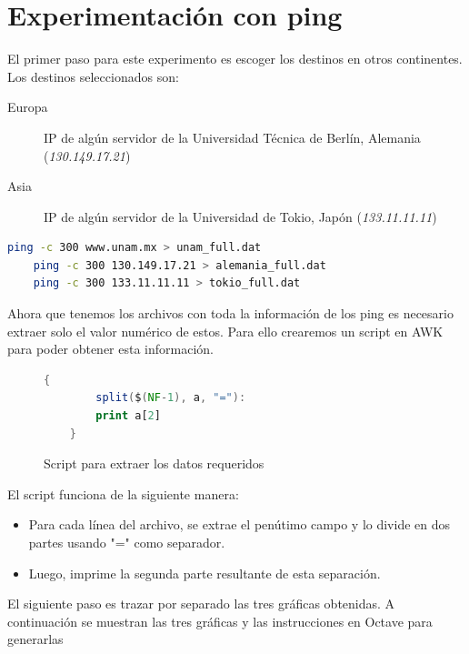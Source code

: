 \section*{Experimentación con ping}

\noindent El primer paso para este experimento es escoger los destinos en otros continentes. Los destinos seleccionados son:

\begin{description}
	\item[Europa] IP de algún servidor de la Universidad Técnica de Berlín, Alemania (\emph{130.149.17.21})
	\item[Asia] IP de algún servidor de la Universidad de Tokio, Japón (\emph{133.11.11.11})
\end{description}

\begin{lstlisting}[language=Bash, caption=Pings con 300 muestras guardando la salida, label=lst:pings]
	ping -c 300 www.unam.mx > unam_full.dat
	ping -c 300 130.149.17.21 > alemania_full.dat
	ping -c 300 133.11.11.11 > tokio_full.dat
\end{lstlisting}

\noindent Ahora que tenemos los archivos con toda la informaci\'on de los ping es necesario extraer solo el valor num\'erico de estos. Para ello crearemos un script en AWK para poder obtener esta informaci\'on. 

\begin{figure}[H]
    \centering
    \begin{lstlisting}[frame=single, breaklines=true, basicstyle=\footnotesize\ttfamily, breakatwhitespace=false, columns=flexible, tabsize=2, showstringspaces=false, language=AWK] 
    {
        split($(NF-1), a, "="):
        print a[2]
    }
    \end{lstlisting}
    \caption{Script para extraer los datos requeridos}
    \label{fig:scriptAWK}
\end{figure}

El script funciona de la siguiente manera:


\begin{itemize}
    \item Para cada l\'inea del archivo, se extrae el pen\'utimo campo y lo divide en dos partes usando "=" como separador.
    \item Luego, imprime la segunda parte resultante de esta separaci\'on.
\end{itemize}

\noindent El siguiente paso es trazar por separado las tres gr\'aficas obtenidas. A continuaci\'on se muestran las tres gr\'aficas y las instrucciones en Octave para generarlas

